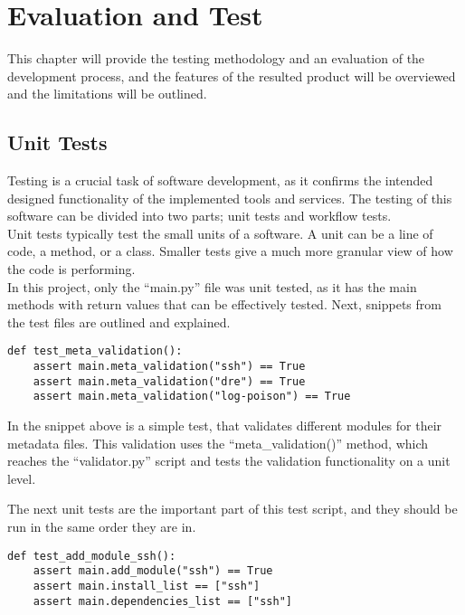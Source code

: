 \chapter{Evaluation and Test}
This chapter will provide the testing methodology and an evaluation of the development process, and the features of the resulted product will be overviewed and the limitations will be outlined.\\

\section{Unit Tests}
Testing is a crucial task of software development, as it confirms the intended designed functionality of the implemented tools and services.
The testing of this software can be divided into two parts; unit tests and workflow tests.\\
Unit tests typically test the small units of a software. A unit can be a line of code, a method, or a class. Smaller tests give a much more granular view of how the code is performing\cite{unittests}.\\

In this project, only the “main.py” file was unit tested, as it has the main methods with return values that can be effectively tested. Next, snippets from the test files are outlined and explained.\\

\begin{lstlisting}[caption=Validation unittest, style=pythonstyle]
def test_meta_validation():
    assert main.meta_validation("ssh") == True
    assert main.meta_validation("dre") == True
    assert main.meta_validation("log-poison") == True
\end{lstlisting}

In the snippet above is a simple test, that validates different modules for their metadata files. This validation uses the “meta\_validation()” method, which reaches the “validator.py” script and tests the validation functionality on a unit level.\\
\clearpage

The next unit tests are the important part of this test script, and they should be run in the same order they are in.\\

\begin{lstlisting}[caption=test\_add\_module\_ssh, style=pythonstyle]
def test_add_module_ssh():
    assert main.add_module("ssh") == True
    assert main.install_list == ["ssh"]
    assert main.dependencies_list == ["ssh"]
\end{lstlisting}


